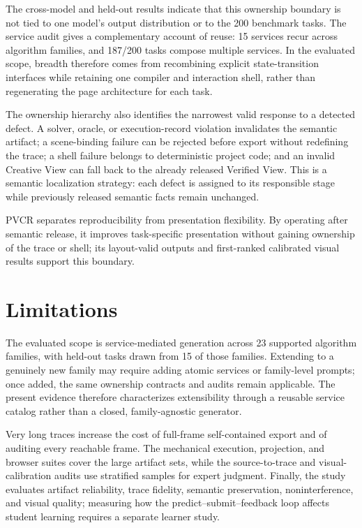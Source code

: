 \documentclass[letterpaper]{article}
\newcommand{\pvcr}{\textsc{PVCR}}
\begin{document}
The cross-model and held-out results indicate that this ownership boundary
is not tied to one model's output distribution or to the 200 benchmark
tasks. The service audit gives a complementary account of reuse: 15
services recur across algorithm families, and 187/200 tasks compose
multiple services. In the evaluated scope, breadth therefore comes from
recombining explicit state-transition interfaces while retaining one
compiler and interaction shell, rather than regenerating the page
architecture for each task.

The ownership hierarchy also identifies the narrowest valid response to
a detected defect. A solver, oracle, or execution-record violation
invalidates the semantic artifact; a scene-binding failure can be
rejected before export without redefining the trace; a shell failure
belongs to deterministic project code; and an invalid Creative View can
fall back to the already released Verified View. This is a semantic
localization strategy: each defect is assigned to its responsible stage
while previously released semantic facts remain unchanged.

\pvcr{} separates reproducibility from presentation flexibility. By
operating after semantic release, it improves task-specific presentation
without gaining ownership of the trace or shell; its layout-valid outputs
and first-ranked calibrated visual results support this boundary.

\section{Limitations}
\label{sec:limitations}

The evaluated scope is service-mediated generation across 23 supported
algorithm families, with held-out tasks drawn from 15 of those families.
Extending to a genuinely new family may require adding atomic services or
family-level prompts; once added, the same ownership contracts and audits
remain applicable. The present evidence therefore characterizes
extensibility through a reusable service catalog rather than a closed,
family-agnostic generator.

Very long traces increase the cost of full-frame self-contained export and
of auditing every reachable frame. The mechanical execution, projection,
and browser suites cover the large artifact sets, while the source-to-trace
and visual-calibration audits use stratified samples for expert judgment.
Finally, the study evaluates artifact reliability, trace fidelity,
semantic preservation, noninterference, and visual quality; measuring how
the predict--submit--feedback loop affects student learning requires a
separate learner study.
\end{document}
